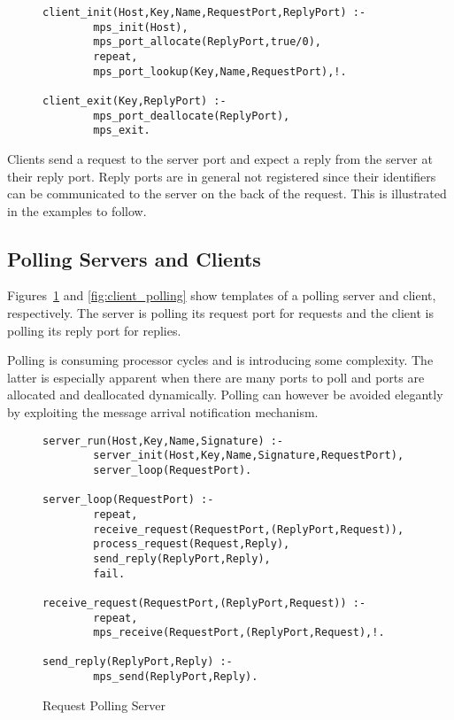 \begin{figure}[hbt]
\begin{verbatim}
client_init(Host,Key,Name,RequestPort,ReplyPort) :- 
        mps_init(Host),
        mps_port_allocate(ReplyPort,true/0),
        repeat,
        mps_port_lookup(Key,Name,RequestPort),!.

client_exit(Key,ReplyPort) :-
        mps_port_deallocate(ReplyPort),
        mps_exit.
\end{verbatim}
\center{
\caption{\label{fig:client_init} {Client Initialisation and Termination}}}
\end{figure} 

Clients send a request to the server port and expect a reply from the
server at their reply port. Reply ports are in general not registered
since their identifiers can be communicated to the server on the back
of the request. This is illustrated in the examples to follow.


\subsection{Polling Servers and Clients}

Figures~\ref{fig:server_polling} and \ref{fig:client_polling} show 
templates of a polling server and client, respectively. The server is 
polling its request port for requests and the client is polling its 
reply port for replies. 

Polling is consuming processor cycles and is introducing some
complexity. The latter is especially apparent when there are many ports 
to poll and ports are allocated and deallocated dynamically. Polling
can however be avoided elegantly by exploiting the message arrival
notification mechanism.

\begin{figure}
\begin{verbatim}
server_run(Host,Key,Name,Signature) :- 
        server_init(Host,Key,Name,Signature,RequestPort),
        server_loop(RequestPort).

server_loop(RequestPort) :- 
        repeat,
        receive_request(RequestPort,(ReplyPort,Request)),
        process_request(Request,Reply),
        send_reply(ReplyPort,Reply),
        fail.

receive_request(RequestPort,(ReplyPort,Request)) :- 
        repeat,
        mps_receive(RequestPort,(ReplyPort,Request),!.

send_reply(ReplyPort,Reply) :-
        mps_send(ReplyPort,Reply).
\end{verbatim}
\caption{\label{fig:server_polling} {Request Polling Server}}
\end{figure} 

